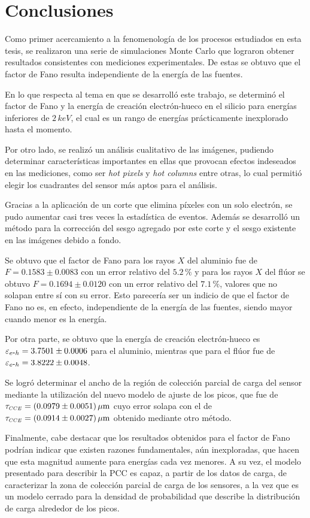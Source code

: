 \chapter{Conclusiones}
\noindent Como primer acercamiento a la fenomenología de los procesos estudiados en esta tesis, se realizaron una serie de simulaciones Monte Carlo que lograron obtener resultados consistentes con mediciones experimentales. De estas se obtuvo que el factor de Fano resulta independiente de la energía de las fuentes.

En lo que respecta al tema en que se desarrolló este trabajo, se determinó el factor de Fano y la energía de creación electrón-hueco en el silicio para energías inferiores de $2\,\si{keV}$, el cual es un rango de energías prácticamente inexplorado hasta el momento.

Por otro lado, se realizó un análisis cualitativo de las imágenes, pudiendo determinar características importantes en ellas que provocan efectos indeseados en las mediciones, como ser \textit{hot pixels} y \textit{hot columns} entre otras, lo cual permitió elegir los cuadrantes del sensor más aptos para el análisis.

Gracias a la aplicación de un corte que elimina píxeles con un solo electrón, se pudo aumentar casi tres veces la estadística de eventos. Además se desarrolló un método para la corrección del sesgo agregado por este corte y el sesgo existente en las imágenes debido a fondo. 

Se obtuvo que el factor de Fano para los rayos $X$ del aluminio fue de $F = 0.1583 \pm 0.0083 $ con un error relativo del $5.2\,\%$ y para los rayos $X$ del flúor se obtuvo $F = 0.1694 \pm 0.0120$ con un error relativo del $7.1\,\%$, valores que no solapan entre sí con su error. Esto parecería ser un indicio de que el factor de Fano no es, en efecto, independiente de la energía de las fuentes, siendo mayor cuando menor es la energía.

Por otra parte, se obtuvo que la energía de creación electrón-hueco es $\varepsilon_{e\mbox{-}h}=3.7501\pm0.0006$ para el aluminio, mientras que para el flúor fue de $\varepsilon_{e\mbox{-}h}=3.8222\pm0.0048$.

Se logró determinar el ancho de la región de colección parcial de carga del sensor mediante la utilización del nuevo modelo de ajuste de los picos, que fue de $\tau_{\scaleto{CCE}{4pt}}=(0.0979 \pm 0.0051)\,\si{\mu m}$ cuyo error solapa con el de $\tau_{\scaleto{CCE}{4pt}}=(0.0914 \pm 0.0027)\,\si{\mu m} $ obtenido mediante otro método\cite{PCC-CCE}.

Finalmente, cabe destacar que los resultados obtenidos para el factor de Fano podrían indicar que existen razones fundamentales, aún inexploradas, que hacen que esta magnitud aumente para energías cada vez menores. A su vez, el modelo presentado para describir la PCC es capaz, a partir de los datos de carga, de caracterizar la zona de colección parcial de carga de los sensores, a la vez que es un modelo cerrado para la densidad de probabilidad que describe la distribución de carga alrededor de los picos.